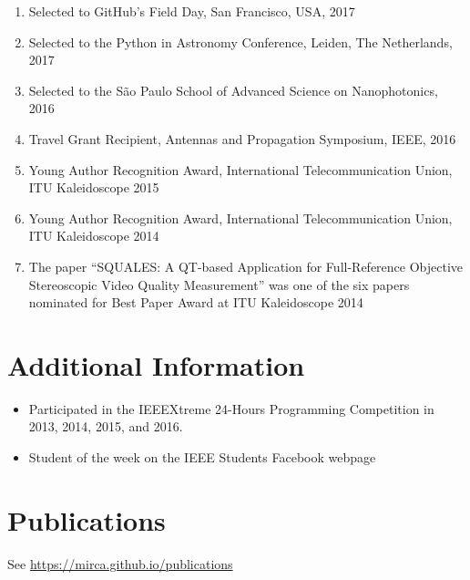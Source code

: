 \documentclass[10pt]{article}
\begin{document}
\begin{titlepage}
\begin{enumerate}
  \item Selected to GitHub's Field Day, San Francisco, USA, 2017
  \item Selected to the Python in Astronomy Conference, Leiden, The Netherlands, 2017
  \item Selected to the S\~ao Paulo School of Advanced Science on Nanophotonics, 2016
  \item Travel Grant Recipient, Antennas and Propagation Symposium, IEEE, 2016
  \item Young Author Recognition Award, International Telecommunication Union, ITU Kaleidoscope 2015
  \item Young Author Recognition Award, International Telecommunication Union, ITU Kaleidoscope 2014
  \item The paper ``SQUALES: A QT-based Application for Full-Reference Objective Stereoscopic Video Quality Measurement'' was one of the six papers nominated for Best Paper Award at ITU Kaleidoscope 2014
\end{enumerate}

\section{Additional Information}
\begin{itemize}
\item Participated in the IEEEXtreme 24-Hours Programming Competition in 2013, 2014, 2015, and 2016.
\item Student of the week on the IEEE Students Facebook webpage
\end{itemize}

\section{Publications}
See \url{https://mirca.github.io/publications}

\end{titlepage}
\end{document}
